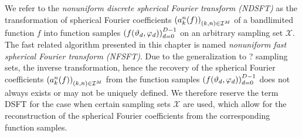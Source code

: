 We refer to the 
\emph{nonuniform discrete spherical Fourier transform (NDSFT)} as the transformation of 
spherical Fourier coefficients $\left(a_{k}^n{\hspace{-0.4ex}}\left(f\right)\right)_{(k,n) \in \mathcal{I}^M}$ 
of a bandlimited function $f$ into function samples $\left(f{\hspace{-0.4ex}}\left(\vartheta_{d},\varphi_{d}\right)\right)_{d=0}^{D-1}$ on an arbitrary sampling set $\mathcal{X}$.
The fast related algorithm presented in this chapter is named \emph{nonuniform fast spherical 
Fourier transform (NFSFT)}. Due to the generalization to ? sampling sets, the inverse 
transformation, hence
the recovery of the spherical Fourier coefficients 
$\left(a_{k}^n{\hspace{-0.4ex}}\left(f\right)\right)_{(k,n) \in \mathcal{I}^M}$ from the function samples
$\left(f{\hspace{-0.4ex}}\left(\vartheta_{d},\varphi_{d}\right)\right)_{d=0}^{D-1}$ does not always exists or may 
not be uniquely defined.
We therefore reserve the term DSFT for the case when 
certain sampling sets $\mathcal{X}$ are used, which allow for the reconstruction of the spherical Fourier coefficients from the corresponding function samples.

